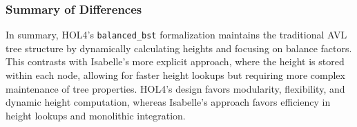\subsubsection{Summary of Differences}
In summary, HOL4’s \texttt{balanced\_bst} formalization maintains the traditional AVL tree structure by dynamically calculating heights and focusing on balance factors. This contrasts with Isabelle’s more explicit approach, where the height is stored within each node, allowing for faster height lookups but requiring more complex maintenance of tree properties. HOL4’s design favors modularity, flexibility, and dynamic height computation, whereas Isabelle’s approach favors efficiency in height lookups and monolithic integration.

